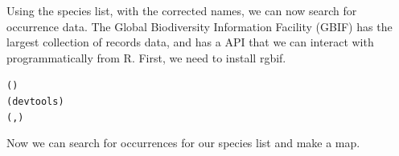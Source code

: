 Using the species list, with the corrected names, we can now search for occurrence data. The Global Biodiversity Information Facility (GBIF) has the largest collection of records data, and has a  API that we can interact with programmatically from R. First, we need to install rgbif.

\begin{knitrout}
\color{fgcolor}\begin{kframe}
\begin{alltt}
()
(devtools)
(, )
\end{alltt}
\end{kframe}
\end{knitrout}


Now we can search for occurrences for our species list and make a map.


